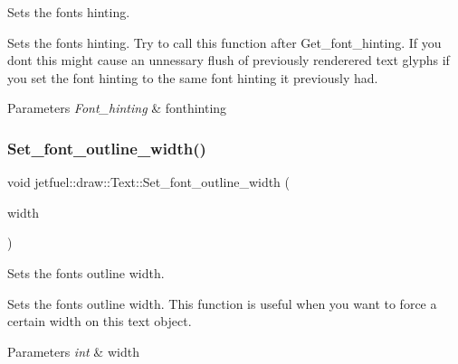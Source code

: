 Sets the font\textquotesingle{}s hinting. 

Sets the font\textquotesingle{}s hinting. Try to call this function after Get\+\_\+font\+\_\+hinting. If you don\textquotesingle{}t this might cause an unnessary flush of previously renderered text glyphs if you set the font hinting to the same font hinting it previously had.


\begin{DoxyParams}{Parameters}
{\em Font\+\_\+hinting} & fonthinting \\
\hline
\end{DoxyParams}
\mbox{\label{classjetfuel_1_1draw_1_1Text_ab8b3959fd37cb3cf9fd919ccdcaa09f3}} 
\subsubsection{\texorpdfstring{Set\+\_\+font\+\_\+outline\+\_\+width()}{Set\_font\_outline\_width()}}
{\footnotesize\ttfamily void jetfuel\+::draw\+::\+Text\+::\+Set\+\_\+font\+\_\+outline\+\_\+width (\begin{DoxyParamCaption}\item[{const int}]{width }\end{DoxyParamCaption})\hspace{0.3cm}{\ttfamily [inline]}}



Sets the font\textquotesingle{}s outline width. 

Sets the font\textquotesingle{}s outline width. This function is useful when you want to force a certain width on this text object.


\begin{DoxyParams}{Parameters}
{\em int} & width \\
\hline
\end{DoxyParams}
\mbox{\label{classjetfuel_1_1draw_1_1Text_ac5bcf85ef9195b5bba77441eeddf2f6c}} 
